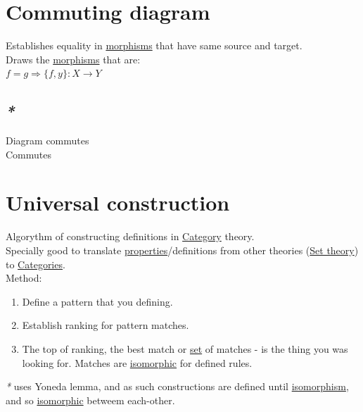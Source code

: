 \documentclass[a4paper,14pt,oneside]{book}
\begin{document}
\section{\label{orgb7ed823}Commuting diagram}
\label{sec:orgeae8a0c}
Establishes equality in \hyperref[org877a4d9]{morphisms} that have same source and target.\\

Draws the \hyperref[org877a4d9]{morphisms} that are:\\
\(f = g \Rightarrow \{f, y\}: X \to Y\)\\

\subsection{\emph{*}}
\label{sec:org0fccda5}

\label{orgedd221a}Diagram commutes\\
\label{org535da67}Commutes\\

\section{\label{org09202b8}Universal construction}
\label{sec:org95c2b23}
Algorythm of constructing definitions in \hyperref[orgc2c97e7]{Category} theory.\\
Specially good to translate \hyperref[orgbcfea7d]{properties}/definitions from other theories (\hyperref[org967a954]{Set theory}) to \hyperref[org426ebf9]{Categories}.\\

Method:\\
\begin{enumerate}
\item Define a pattern that you defining.\\
\item Establish ranking for pattern matches.\\
\item The top of ranking, the best match or \hyperref[org0f7f8fa]{set} of matches - is the thing you was looking for. Matches are \hyperref[org1a2e81e]{isomorphic} for defined rules.\\
\end{enumerate}

\emph{*} uses Yoneda lemma, and as such constructions are defined until \hyperref[org32ed122]{isomorphism}, and so \hyperref[org1a2e81e]{isomorphic} betweem each-other.\\
\end{document}
